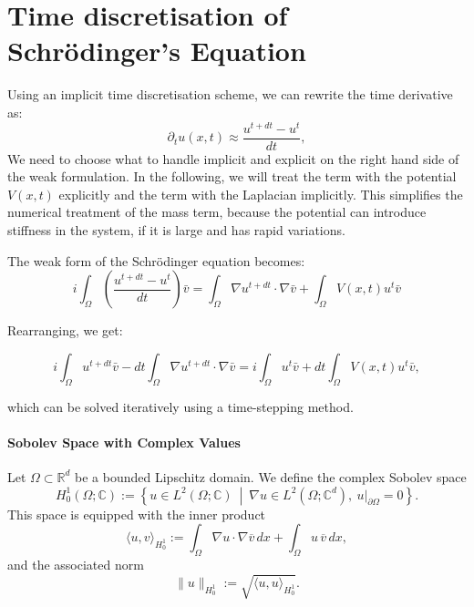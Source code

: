 \documentclass{article}
\theoremstyle{definition}
\theoremstyle{plain}
\theoremstyle{remark}
\begin{document}
\section{Time discretisation of Schrödinger's Equation}
Using an implicit time discretisation scheme, we can rewrite the time derivative as:
\begin{equation}
    \partial_t u(x,t) \approx \frac{u^{t + dt} - u^t}{dt},
\end{equation}
We need to choose what to handle implicit and explicit on the right hand side of the weak formulation.
In the following, we will treat the term with the potential $V(x,t)$ explicitly and the term with the Laplacian implicitly.
This simplifies the numerical treatment of the mass term, because the potential can introduce stiffness in the system, if it is large and has rapid variations.


The weak form of the Schrödinger equation becomes:
\begin{equation}
    i \int_{\Omega} \left( \frac{u^{t + dt} - u^t}{dt} \right) \bar{v} = \int_{\Omega} \nabla u^{t + dt} \cdot \nabla \bar{v} + \int_{\Omega} V(x,t) u^t \bar{v}
\end{equation}

Rearranging, we get:

\begin{equation}
    i \int_{\Omega} u^{t + dt} \bar{v} - dt \int_{\Omega} \nabla u^{t + dt} \cdot \nabla \bar{v} = i \int_{\Omega} u^t \bar{v} + dt \int_{\Omega} V(x,t) u^t \bar{v},
\end{equation}

which can be solved iteratively using a time-stepping method.

\paragraph{Sobolev Space with Complex Values}
Let $\Omega \subset \mathbb{R}^d$ be a bounded Lipschitz domain. We define the complex Sobolev space
\[
H_0^1(\Omega; \mathbb{C}) := \left\{ u \in L^2(\Omega; \mathbb{C}) \ \middle| \ \nabla u \in L^2(\Omega; \mathbb{C}^d), \ u|_{\partial \Omega} = 0 \right\}.
\]
This space is equipped with the inner product
\[
\langle u, v \rangle_{H_0^1} := \int_\Omega \nabla u \cdot \nabla \overline{v} \, dx + \int_\Omega u \, \overline{v} \, dx,
\]
and the associated norm
\[
\|u\|_{H_0^1} := \sqrt{ \langle u, u \rangle_{H_0^1} }.
\]
\end{document}
